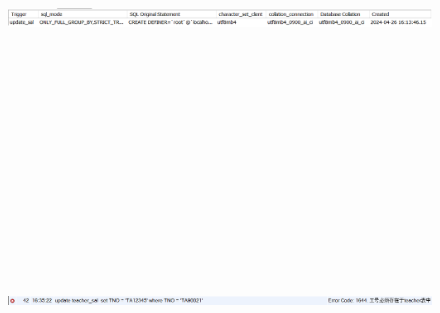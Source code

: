 \documentclass{ctexart}
\begin{document}
		\begin{figure}[H]
			\centering 
			\includegraphics[height=7cm,width=14cm]{53.png}
			\end{figure}
			\begin{figure}[H]
				\centering 
				\includegraphics[height=7cm,width=14cm]{54.png}
				\end{figure}
\end{document}

